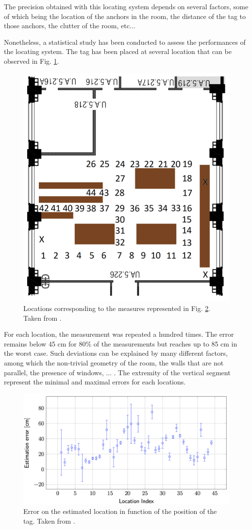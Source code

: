 The precision obtained with this locating system depends on several factors, some of which being the location of the anchors in the room, the distance of the tag to those anchors, the clutter of the room, etc...
\vspace{2mm}

Nonetheless, a statistical study has been conducted to assess the performances of the locating system. The tag has been placed at several location that can be observed in Fig. \ref{fig:test_map}.

\begin{figure}[H]
	\centering
	\includegraphics[width=.35\linewidth]{Images/test_map.png}
	\caption{Locations corresponding to the measures represented in Fig. \ref{fig:test_result}. Taken from \cite{hannotier2019indoor}.}
	\label{fig:test_map}
\end{figure}

For each location, the measurement was repeated a hundred times. The error remains below 45 cm for 80\% of the measurements but reaches up to 85 cm in the worst case. Such deviations can be explained by many different factors, among which the non-trivial geometry of the room, the walls that are not parallel, the presence of windows, ... \cite{hannotier2019indoor}. The extremity of the vertical segment represent the minimal and maximal errors for each locations.
\vspace{2mm}

\begin{figure}[H]
	\centering
	\includegraphics[width=.8\linewidth]{Images/test_fig.png}
	\caption{Error on the estimated location in function of the position of the tag. Taken from \cite{hannotier2019indoor}.}
	\label{fig:test_result}
\end{figure}

